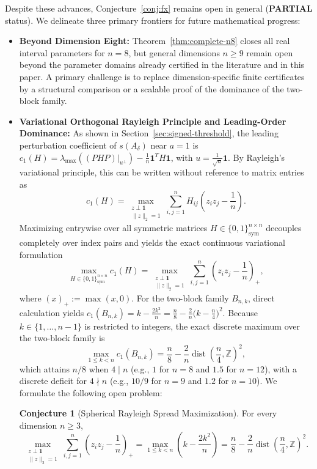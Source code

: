 \documentclass[11pt,reqno]{article}
\theoremstyle{definition}
\newtheorem{conjecture}[theorem]{Conjecture}
\newcommand{\Z}{\mathbb{Z}}
\newcommand{\one}{\mathbf{1}}
\begin{document}
Despite these advances, Conjecture~\ref{conj:fx} remains open in general (\textbf{PARTIAL} status). We delineate three primary frontiers for future mathematical progress:
\begin{itemize}
    \item \textbf{Beyond Dimension Eight:} Theorem~\ref{thm:complete-n8} closes all real interval parameters for $n=8$, but general dimensions $n\ge9$ remain open beyond the parameter domains already certified in the literature and in this paper. A primary challenge is to replace dimension-specific finite certificates by a structural comparison or a scalable proof of the dominance of the two-block family.
    \item \textbf{Variational Orthogonal Rayleigh Principle and Leading-Order Dominance:} As shown in Section~\ref{sec:signed-threshold}, the leading perturbation coefficient of $s(A_\delta)$ near $a = 1$ is $c_1(H) = \lambda_{\max}((PHP)|_{u^\perp}) - \frac{1}{n}\one^T H \one$, with $u = \frac{1}{\sqrt{n}}\one$. By Rayleigh's variational principle, this can be written without reference to matrix entries as
    \begin{equation}\label{eq:rayleigh-c1}
    c_1(H) = \max_{\substack{z \perp \one \\ \|z\|_2 = 1}} \sum_{i,j=1}^n H_{ij}\left(z_i z_j - \frac{1}{n}\right).
    \end{equation}
    Maximizing entrywise over all symmetric matrices $H \in \{0, 1\}^{n \times n}_{\mathrm{sym}}$ decouples completely over index pairs and yields the exact continuous variational formulation
    \begin{equation}\label{eq:sphere-c1}
    \max_{H \in \{0, 1\}^{n \times n}_{\mathrm{sym}}} c_1(H) = \max_{\substack{z \perp \one \\ \|z\|_2 = 1}} \sum_{i,j=1}^n \left(z_i z_j - \frac{1}{n}\right)_+,
    \end{equation}
    where $(x)_+ := \max(x, 0)$. For the two-block family $B_{n, k}$, direct calculation yields $c_1(B_{n, k}) = k - \frac{2k^2}{n} = \frac{n}{8} - \frac{2}{n}\bigl(k - \frac{n}{4}\bigr)^2$. Because $k \in \{1, \dots, n-1\}$ is restricted to integers, the exact discrete maximum over the two-block family is
    \begin{equation}
    \max_{1 \le k < n} c_1(B_{n, k}) = \frac{n}{8} - \frac{2}{n}\operatorname{dist}\left(\frac{n}{4}, \Z\right)^2,
    \end{equation}
    which attains $n/8$ when $4 \mid n$ (e.g., $1$ for $n=8$ and $1.5$ for $n=12$), with a discrete deficit for $4 \nmid n$ (e.g., $10/9$ for $n=9$ and $1.2$ for $n=10$). We formulate the following open problem:
    \begin{conjecture}[Spherical Rayleigh Spread Maximization]\label{conj:spherical-c1}
    For every dimension $n \ge 3$,
    \begin{equation}
    \max_{\substack{z \perp \one \\ \|z\|_2 = 1}} \sum_{i,j=1}^n \left(z_i z_j - \frac{1}{n}\right)_+ = \max_{1 \le k < n} \left(k - \frac{2k^2}{n}\right) = \frac{n}{8} - \frac{2}{n}\operatorname{dist}\left(\frac{n}{4}, \Z\right)^2.
    \end{equation}
    \end{conjecture}


\end{itemize}
\end{document}
